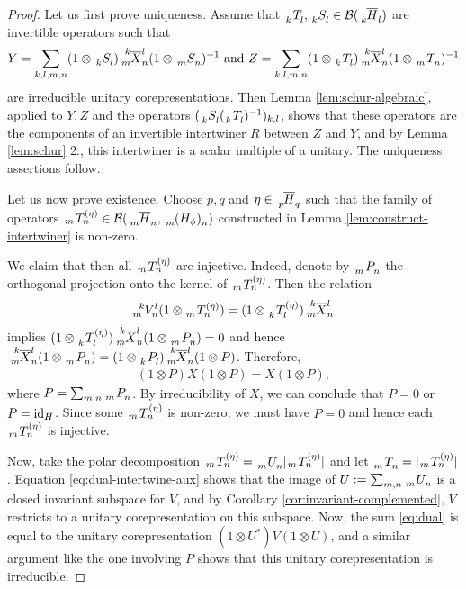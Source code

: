 \begin{proof}
Let us first prove uniqueness. Assume that $\Grd{T}{k}{l},\Grd{S}{k}{l} \in
\mathcal{B}(\Grd{\overline{H}}{k}{l})$ are invertible operators such that
\begin{align*}
  Y = \sum_{k,l,m,n} (1\otimes \Grd{S}{k}{l}) \Gr{\overline{X}}{k}{l}{m}{n} (1 \otimes
  \Grd{S}{m}{n})^{-1}  \text{ and }
  Z = \sum_{k,l,m,n} (1\otimes \Grd{T}{k}{l}) \Gr{\overline{X}}{k}{l}{m}{n} (1 \otimes
  \Grd{T}{m}{n})^{-1}
\end{align*}
are irreducible unitary corepresentations. Then Lemma \ref{lem:schur-algebraic}, applied to $Y,Z$
and the operators $(\Grd{S}{k}{l}(\Grd{T}{k}{l})^{-1})_{k,l}$, shows that these operators are the
components of an invertible intertwiner $R$ between $Z$ and $Y$, and by Lemma \ref{lem:schur} 2.,
this intertwiner is a scalar multiple of a unitary. The uniqueness assertions follow.

Let us now prove existence.  Choose $p,q$ and $\eta\in \Grd{\overline{H}}{p}{q}$ such that the
family of operators $\Gr{T}{}{(\eta)}{m}{n} \in
\mathcal{B}(\Grd{\overline{H}}{m}{n},\Grd{(H_{\phi})}{m}{n})$ constructed in Lemma
\ref{lem:construct-intertwiner} is non-zero.

We claim that then all $\Gr{T}{}{(\eta)}{m}{n}$ are injective.  Indeed, denote by $\Grd{P} {m}{n}$
the orthogonal projection onto the kernel of $\Gr{T}{}{(\eta)}{m}{n}$. Then the relation
\begin{align} \label{eq:dual-intertwine-aux}
  \Gr{V}{k}{l}{m}{n}(1\otimes \Gr{T}{}{(\eta)}{m}{n}) = (1\otimes \Gr{T}{}{(\eta)}{k}{l})\Gr{\overline{X}}{k}{l}{m}{n}
\end{align}
implies $(1\otimes \Gr{T}{}{(\eta)}{k}{l})\Gr{\overline{X}}{k}{l}{m}{n} (1 \otimes \Grd{P}{m}{n}) =
0$ and hence $\Gr{\overline{X}}{k}{l}{m}{n} (1 \otimes \Grd{P}{m}{n}) = (1 \otimes \Grd{P}{k}{l})
\Gr{\overline{X}}{k}{l}{m}{n}(1 \otimes P)$. Therefore,
\begin{align*}
  (1 \otimes P)X(1\otimes P) = X(1\otimes P),
\end{align*}
where $P=\sum_{m,n} \Grd{P}{m}{n}$.  By irreducibility of $X$, we can conclude that $P=0$ or
$P=\operatorname{id}_{H}$. Since some $\Gr{T}{}{(\eta)}{m}{n}$ is non-zero, we must have $P=0$ and hence each $\Gr{T}{}{(\eta)}{m}{n}$ is injective.

Now, take the polar decomposition $\Gr{T}{}{(\eta)}{m}{n}=\Grd{U}{m}{n} |\Gr{T}{}{(\eta)}{m}{n}|$
and let $\Grd{T}{m}{n}=|\Gr{T}{}{(\eta)}{m}{n}|$.   Equation \eqref{eq:dual-intertwine-aux} shows
that the image of $U:=\sum_{m,n} \Grd{U}{m}{n}$ is a closed invariant subspace for $V$, and by Corollary
\ref{cor:invariant-complemented}, $V$ restricts to a unitary corepresentation on this subspace.
Now, the sum \eqref{eq:dual} is equal to the unitary corepresentation $(1\otimes U^{*})V(1\otimes
U)$, and a similar argument like the one involving $P$ shows that this unitary corepresentation is irreducible.
\end{proof}

